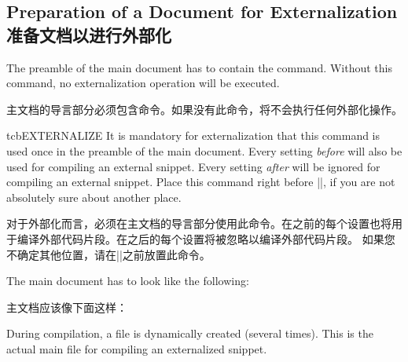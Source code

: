 \subsection{Preparation of a Document for Externalization\\准备文档以进行外部化}\label{subsec:external_preparation}

The preamble of the main document has to contain the 
command. Without this command, no externalization operation will be
executed.

主文档的导言部分必须包含命令。如果没有此命令，将不会执行任何外部化操作。
\begin{docCommand}[doc new=2015-03-11]{tcbEXTERNALIZE}{}
It is mandatory for externalization that this command is used once
in the preamble of the main document. Every setting \emph{before}
 will also be used for compiling an external
snippet. Every setting \emph{after}  will be
ignored for compiling an external snippet.
Place this command right before ||, if you are not
absolutely sure about another place.

对于外部化而言，必须在主文档的导言部分使用此命令。在之前的每个设置也将用于编译外部代码片段。在之后的每个设置将被忽略以编译外部代码片段。
如果您不确定其他位置，请在||之前放置此命令。

The main document has to look like the following:

主文档应该像下面这样：
\end{docCommand}

During compilation, a  file
is dynamically created (several times). This is the actual main file for
compiling an externalized snippet.

